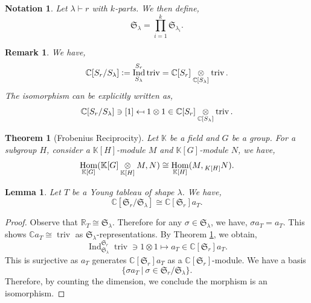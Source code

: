 \documentclass{article}
\newtheorem{theorem}{Theorem} [section]
\newtheorem{lemma}{Lemma}[section]
\newtheorem{notation}{Notation}[section]
\newtheorem{remark}{Remark}[section]
\numberwithin{equation}{theorem}
\DeclareMathOperator{\triv}{triv}
\DeclareMathOperator{\Ind}{Ind}
\DeclareMathOperator{\Hom}{Hom}
\newcommand{\defeq}{\vcentcolon=}
\newcommand{\R}[0]{\mathbb{R}}
\newcommand{\C}[0]{\mathbb{C}}
\newcommand{\K}[0]{\mathbb{K}}
\newcommand{\sep}[0]{\:|\:}
\newcommand{\fS}[0]{\mathfrak{S}}
\newcommand{\tens}[1]{%
  \mathbin{\mathop{\otimes}\displaylimits_{#1}}%
}
\begin{document}
\begin{notation}
    Let $\lambda\vdash r$ with $k$-parts. We then define,
    \begin{equation*}
        \fS_\lambda = \prod_{i=1}^k\fS_{\lambda_i}.
    \end{equation*}
\end{notation}
\begin{remark}
    We have,
    \begin{equation*}
        \C[S_r/S_\lambda]\defeq \Ind_{S_\lambda}^{S_r}\triv = \C[S_r]\tens{\C[S_\lambda]}\triv.
    \end{equation*}
    The isomorphism can be explicitly written as,
    \begin{equation*}
        \C[S_r/S_\lambda]\ni[1]\mapsfrom 1\otimes 1\in\C[S_r]\tens{\C[S_\lambda]}\triv.
    \end{equation*}
\end{remark}
\begin{theorem}[Frobenius Reciprocity]
    Let $\K$ be a field and $G$ be a group. For a subgroup $H$, consider a $\K[H]$-module $M$ and $\K[G]$-module $N$, we have,
    \begin{equation*}
        \Hom_{\K[G]}(\K[G]\tens{\K[H]}M,N)\cong \Hom_{\K[H]}(M,\prescript{}{K[H]}{N}).
    \end{equation*}
    \label{theorem_frobenius}
\end{theorem}
\begin{lemma}
    \label{lemma_frobenius_group_ring}
    Let $T$ be a Young tableau of shape $\lambda$. We have,
    \begin{equation*}
        \C[\fS_r/\fS_\lambda] \cong \C[\fS_r]a_T.
    \end{equation*}
\end{lemma}
\begin{proof}
    Observe that $\R_T\cong \fS_\lambda$. Therefore for any $\sigma\in\fS_\lambda$, we have, $\sigma a_T=a_T$. This shows $\C a_T\cong\triv$ as $\fS_\lambda$-representations. By Theorem \ref{theorem_frobenius}, we obtain,
    \begin{equation*}
        \Ind_{\fS_\lambda}^{\fS_r}\triv \ni1\otimes 1\mapsto a_T\in\C[\fS_r]a_T.
    \end{equation*}
    This is surjective as $a_T$ generates $\C[\fS_r]a_T$ as a $\C[\fS_r]$-module. We have a basis 
    \begin{equation*}
        \{\sigma a_T\sep \sigma\in\fS_r/\fS_\lambda\}.
    \end{equation*}
    Therefore, by counting the dimension, we conclude the morphism is an isomorphism.
\end{proof}
\end{document}

